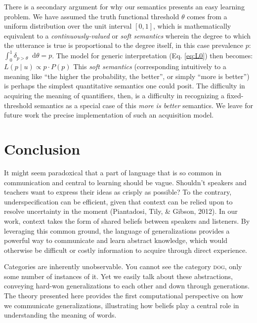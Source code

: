 \documentclass[english,,man,floatsintext]{apa6}
\theoremstyle{definition}
\theoremstyle{definition}
\theoremstyle{definition}
\theoremstyle{remark}
\begin{document}
There is a secondary argument for why our semantics presents an easy
learning problem. We have assumed the truth functional threshold
\(\theta\) comes from a uniform distribution over the unit interval
\([0, 1]\), which is mathematically equivalent to a
\emph{continuously-valued} or \emph{soft semantics} wherein the degree
to which the utterance is true is proportional to the degree itself, in
this case prevalence \(p\):
\(\int_{0}^{1} \delta_{p > \theta} \mathop{}\!\mathrm{d}\theta = p\).
The model for generic interpretation (Eq. \ref{eq:L0}) then becomes:
\(L(p \mid u) \propto p \cdot P(p)\) This \emph{soft semantics}
(corresponding intuitively to a meaning like \enquote{the higher the
probability, the better}, or simply \enquote{more is better}) is perhaps
the simplest quantitative semantics one could posit. The difficulty in
acquiring the meaning of quantifiers, then, is a difficulty in
recognizing a fixed-threshold semantics as a special case of this
\emph{more is better} semantics. We leave for future work the precise
implementation of such an acquisition model.

\hypertarget{conclusion}{%
\section{Conclusion}\label{conclusion}}

It might seem paradoxical that a part of language that is so common in
communication and central to learning should be vague. Shouldn't
speakers and teachers want to express their ideas as crisply as
possible? To the contrary, underspecification can be efficient, given
that context can be relied upon to resolve uncertainty in the moment
(Piantadosi, Tily, \& Gibson, 2012). In our work, context takes the form
of shared beliefs between speakers and listeners. By leveraging this
common ground, the language of generalizations provides a powerful way
to communicate and learn abstract knowledge, which would otherwise be
difficult or costly information to acquire through direct experience.

Categories are inherently unobservable. You cannot see the category
\textsc{dog}, only some number of instances of it. Yet we easily talk
about these abstractions, conveying hard-won generalizations to each
other and down through generations. The theory presented here provides
the first computational perspective on how we communicate
generalizations, illustrating how beliefs play a central role in
understanding the meaning of words.
\end{document}
